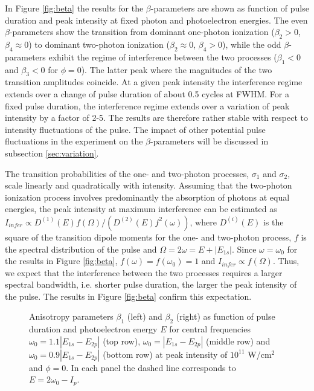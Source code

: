 In Figure \ref{fig:beta} the results for the \textbf{$\beta$}-parameters are shown as function of pulse duration and peak intensity at fixed photon and photoelectron energies. The even $\beta$-parameters show the transition from dominant one-photon ionization ($\beta_2 > 0$, $\beta_4 \approx 0$) to dominant two-photon ionization ($\beta_2 \approx 0$, $\beta_4 > 0$), while the odd $\beta$-parameters exhibit the regime of interference between the two processes ($\beta_1 < 0$ and $\beta_3 < 0$ for $\phi=0$). The latter peak where the magnitudes of the two transition amplitudes coincide. At a given peak intensity the interference regime extends over a change of pulse duration of about 0.5 cycles at FWHM. For a fixed pulse duration, the interference regime extends over a variation of peak intensity by a factor of 2-5. The results are therefore rather stable with respect to intensity fluctuations of the pulse. The impact of other potential pulse fluctuations in the experiment on the $\beta$-parameters will be discussed in subsection \ref{sec:variation}.

The transition probabilities of the one- and two-photon processes, $\sigma_1$ and $\sigma_2$, scale linearly and quadratically with intensity. Assuming that the two-photon ionization process involves predominantly the absorption of photons at equal energies, the peak intensity at maximum interference can be estimated as $I_{infer} \propto D^{(1)}(E)f(\Omega)/(D^{(2)}(E)f^2(\omega))$, where $D^{(i)}(E)$ is the square of the transition dipole moments for the one- and two-photon process, $f$ is the spectral distribution of the pulse and $\Omega = 2\omega = E + |E_{1s}|$. Since $\omega = \omega_0$ for the results in Figure \ref{fig:beta}, $f(\omega) = f(\omega_0) = 1$ and $I_{infer} \propto f(\Omega)$. Thus, we expect that the interference between the two processes requires a larger spectral bandwidth, i.e. shorter pulse duration, the larger the peak intensity of the pulse. The results in Figure \ref{fig:beta} confirm this expectation.

\begin{figure}[t]
\centering
\caption{
Anisotropy parameters $\beta_1$ (left) and $\beta_2$ (right) as function of pulse duration and photoelectron energy $E$ for central frequencies $\omega_0 = 1.1 |E_{1s}-E_{2p}|$ (top row), $\omega_0 = |E_{1s}-E_{2p}|$ (middle row) and $\omega_0 = 0.9 |E_{1s}-E_{2p}|$ (bottom row) at peak intensity of $10^{11}$ W/cm$^2$ and $\phi = 0$. In each panel the dashed line corresponds to $E = 2\omega_0 - I_p$. 
} 
  \label{fig:beta_omega}
\end{figure}

